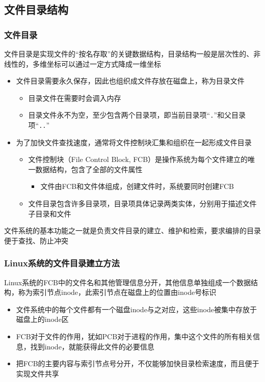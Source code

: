 \documentclass[cs4size,a4paper,10pt]{ctexart}
\begin{document}
	\subsection{文件目录结构}

	\subsubsection{文件目录}
	文件目录是实现文件的“按名存取”的关键数据结构，目录结构一般是层次性的、非线性的，多维坐标可以通过一定方式降成一维坐标
	\begin{itemize}
		\item 文件目录需要永久保存，因此也组织成文件存放在磁盘上，称为目录文件
		\begin{itemize}
			\item 目录文件在需要时会调入内存
			\item 目录文件永不为空，至少包含两个目录项，即当前目录项“\verb|.|”和父目录项“\verb|..|”
		\end{itemize}
		\item 为了加快文件查找速度，通常将文件控制块汇集和组织在一起形成文件目录
		\begin{itemize}
			\item 文件控制块（File Control Block, FCB）是操作系统为每个文件建立的唯一数据结构，包含了全部的文件属性
			\begin{itemize}
				\item 文件由FCB和文件体组成，创建文件时，系统要同时创建FCB
			\end{itemize}
			\item 文件目录包含许多目录项，目录项具体记录两类实体，分别用于描述文件子目录和文件
		\end{itemize}
	\end{itemize}

	文件系统的基本功能之一就是负责文件目录的建立、维护和检索，要求编排的目录便于查找、防止冲突

	\subsubsection{Linux系统的文件目录建立方法}
	Linux系统的FCB中的文件名和其他管理信息分开，其他信息单独组成一个数据结构，称为索引节点inode，此索引节点在磁盘上的位置由inode号标识
	\begin{itemize}
		\item 文件系统中的每个文件都有一个磁盘inode与之对应，这些inode被集中存放于磁盘上的inode区
		\item FCB对于文件的作用，犹如PCB对于进程的作用，集中这个文件的所有相关信息，找到inode，就能获得此文件的必要信息
		\item 把FCB的主要内容与索引节点号分开，不仅能够加快目录检索速度，而且便于实现文件共享
	\end{itemize}
\end{document}
